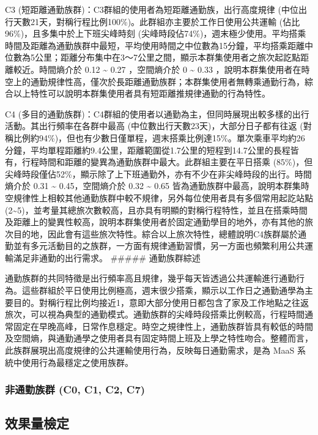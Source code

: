 C3 (短距離通勤族群)：C3群組的使用者為短距離通勤族，出行高度規律
(中位出行天數21天，對稱行程比例100\%)。此群組亦主要於工作日使用公共運輸
(佔比96\%)，且多集中於上下班尖峰時刻
(尖峰時段佔74\%)，週末極少使用。平均搭乘時間及距離為通勤族群中最短，平均使用時間之中位數為15分鐘，平均搭乘距離中位數為5公里；距離分布集中在3～7公里之間，顯示本群集使用者之旅次起訖點距離較近。時間熵介於
0.12 \textasciitilde{} 0.27 ，空間熵介於 0 \textasciitilde{} 0.33
，說明本群集使用者在時空上的通勤規律性高，僅次於長距離通勤族群；本群集使用者無轉乘通勤行為，綜合以上特性可以說明本群集使用者具有短距離推規律通勤的行為特性。

C4
(多目的通勤族群)：C4群組的使用者以通勤為主，但同時展現出較多樣的出行活動。其出行頻率在各群中最高
(中位數出行天數23天)，大部分日子都有往返
(對稱比例約94\%)，但也有少數日僅單程，週末搭乘比例達15\%。單次乘車平均約26分鐘，平均單程距離約9.4公里，距離範圍從1.7公里的短程到14.7公里的長程皆有，行程時間和距離的變異為通勤族群中最大。此群組主要在平日搭乘
(85\%)，但尖峰時段僅佔52\%，顯示除了上下班通勤外，亦有不少在非尖峰時段的出行。時間熵介於
0.31 \textasciitilde{} 0.45，空間熵介於 0.32 \textasciitilde{} 0.65
皆為通勤族群中最高，說明本群集時空規律性上相較其他通勤族群中較不規律，另外每位使用者具有多個常用起訖站點
(2\textasciitilde5)，並考量其總旅次數較高，且亦具有明顯的對稱行程特性，並且在搭乘時間及距離上的變異性較高，說明本群集使用者於固定通勤學目的地外，亦有其他的旅次目的地，因此會有這些旅次特性。綜合以上旅次特性，總體說明C4族群屬於通勤並有多元活動目的之族群，一方面有規律通勤習慣，另一方面也頻繁利用公共運輸滿足非通勤的出行需求。
\#\#\#\#\# 通勤族群綜述

通勤族群的共同特徵是出行頻率高且規律，幾乎每天皆透過公共運輸進行通勤行為。這些群組於平日使用比例極高，週末很少搭乘，顯示以工作日之通勤通學為主要目的。對稱行程比例均接近1，意即大部分使用日都包含了家及工作地點之往返旅次，可以視為典型的通勤模式。通勤族群的尖峰時段搭乘比例較高，行程時間通常固定在早晚高峰，日常作息穩定。時空之規律性上，通勤族群皆具有較低的時間及空間熵，與通勤通學之使用者具有固定時間上班及上學之特性吻合。整體而言，此族群展現出高度規律的公共運輸使用行為，反映每日通勤需求，是為
MaaS 系統中使用行為最穩定之使用族群。

\subsubsection{非通勤族群 (C0, C1, C2,
C7)}\label{ux975eux901aux52e4ux65cfux7fa4-c0-c1-c2-c7}

\subsection{效果量檢定}\label{ux6548ux679cux91cfux6aa2ux5b9a}


